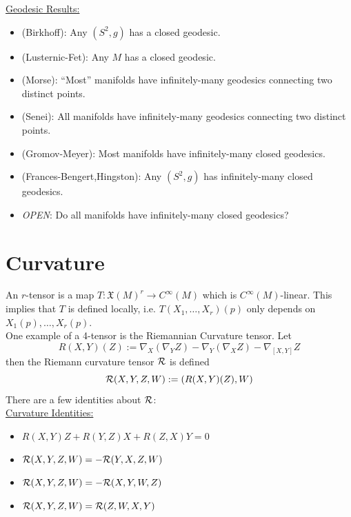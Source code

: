 \documentclass{amsart}
\renewcommand{\X}{\mathfrak{X}}
\begin{document}
	\underline{Geodesic Results:}
	\begin{itemize}
		\item (Birkhoff): Any $(S^2,g)$ has a closed geodesic.
		\item (Lusternic-Fet): Any $M$ has a closed geodesic.
		\item (Morse): ``Most'' manifolds have infinitely-many geodesics connecting two distinct points.
		\item (Senei): All manifolds have infinitely-many geodesics connecting two distinct points.
		\item (Gromov-Meyer): Most manifolds have infinitely-many closed geodesics.
		\item (Frances-Bengert,Hingston): Any $(S^2,g)$ has infinitely-many closed geodesics.
		\item \textit{OPEN}: Do all manifolds have infinitely-many closed geodesics?
	\end{itemize}
	
	
	\section{Curvature}
	
	An $r$-tensor is a map $T:\X(M)^r\to C^{\infty}(M)$ which is $C^{\infty}(M)$-linear. This implies that $T$ is defined locally, i.e. $T(X_1,\dots,X_r)(p)$ only depends on $X_1(p),\dots,X_r(p)$.\\
	
	One example of a 4-tensor is the Riemannian Curvature tensor. Let 
	$$
	R(X,Y)(Z) := \nabla_X(\nabla_Y Z) - \nabla_Y(\nabla_X Z) - \nabla_{[X,Y]}Z
	$$
	then the Riemann curvature tensor $\mathcal{R}$ is defined
	$$
	\mathcal{R}(X,Y,Z,W) := (R(X,Y)(Z),W)
	$$
	There are a few identities about $\mathcal{R}$:\\
	
	\underline{Curvature Identities:}
	\begin{itemize}
		\item $R(X,Y)Z + R(Y,Z)X + R(Z,X)Y=0$
		\item $\mathcal{R}(X,Y,Z,W) = - \mathcal{R}(Y,X,Z,W)$
		\item $\mathcal{R}(X,Y,Z,W) = -\mathcal{R}(X,Y,W,Z)$
		\item $\mathcal{R}(X,Y,Z,W) = \mathcal{R}(Z,W,X,Y)$
	\end{itemize}
	
\end{document}
